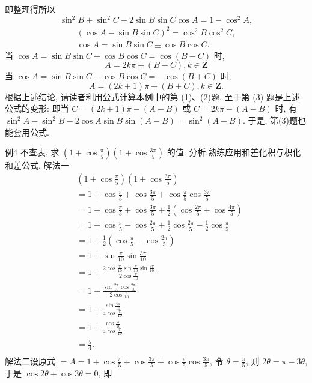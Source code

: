 即整理得所以
$$
\sin ^2 B+\sin ^2 C-2 \sin B \sin C \cos A=1-\cos ^2 A,
$$
$$
\begin{gathered}
(\cos A-\sin B \sin C)^2=\cos ^2 B \cos ^2 C, \\
\cos A=\sin B \sin C \pm \cos B \cos C .
\end{gathered}
$$
当 $\cos A=\sin B \sin C+\cos B \cos C=\cos (B-C)$ 时,
$$
A=2 k \pi \pm(B-C), k \in \mathbf{Z}
$$
当 $\cos A=\sin B \sin C-\cos B \cos C=-\cos (B+C)$ 时,
$$
A=(2 k+1) \pi \pm(B+C), k \in \mathbf{Z} .
$$
根据上述结论, 请读者利用公式计算本例中的第 (1)、(2)题.
至于第 (3) 题是上述公式的变形: 即当 $C=(2 k+1) \pi-(A-B)$ 或 $C=2 k \pi-(A-B)$ 时, 有 $\sin ^2 A-\sin ^2 B-2 \cos A \sin B \sin (A-B)=\sin ^2(A-B)$. 于是, 第(3)题也能套用公式.



例4 不查表, 求 $\left(1+\cos \frac{\pi}{5}\right)\left(1+\cos \frac{3 \pi}{5}\right)$ 的值.
分析:熟练应用和差化积与积化和差公式.
解法一 
$$
\begin{aligned}
& \left(1+\cos \frac{\pi}{5}\right)\left(1+\cos \frac{3 \pi}{5}\right) \\
& =1+\cos \frac{\pi}{5}+\cos \frac{3 \pi}{5}+\cos \frac{\pi}{5} \cos \frac{3 \pi}{5} \\
& =1+\cos \frac{\pi}{5}+\cos \frac{3 \pi}{5}+\frac{1}{2}\left(\cos \frac{2 \pi}{5}+\cos \frac{4 \pi}{5}\right) \\
& =1+\cos \frac{\pi}{5}-\cos \frac{2 \pi}{5}+\frac{1}{2} \cos \frac{2 \pi}{5}-\frac{1}{2} \cos \frac{\pi}{5} \\
& =1+\frac{1}{2}\left(\cos \frac{\pi}{5}-\cos \frac{2 \pi}{5}\right) \\
& =1+\sin \frac{\pi}{10} \sin \frac{3 \pi}{10} \\
& =1+\frac{2 \cos \frac{\pi}{10} \sin \frac{\pi}{10} \sin \frac{3 \pi}{10}}{2 \cos \frac{\pi}{10}} \\
& =1+\frac{\sin \frac{2 \pi}{10} \cos \frac{2 \pi}{10}}{2 \cos \frac{\pi}{10}} \\
& =1+\frac{\sin \frac{4 \pi}{10}}{4 \cos \frac{\pi}{10}} \\
& =1+\frac{\cos \frac{ \pi}{10}}{4 \cos \frac{\pi}{10}} \\
& =\frac{5}{4} . \\
\end{aligned}
$$
解法二设原式 $=A=1+\cos \frac{\pi}{5}+\cos \frac{3 \pi}{5}+\cos \frac{\pi}{5} \cos \frac{3 \pi}{5}$, 令 $\theta=\frac{\pi}{5}$, 则 $2 \theta=\pi-3 \theta$, 于是 $\cos 2 \theta+\cos 3 \theta=0$, 即
